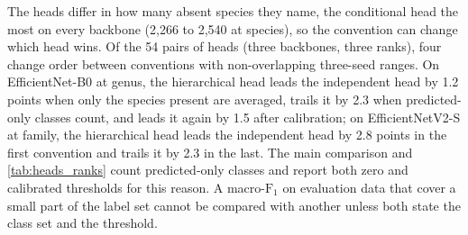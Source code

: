 The heads differ in how many absent species they name, the conditional head the most on every backbone (2,266 to 2,540 at species), so the convention can change which head wins.
Of the 54 pairs of heads (three backbones, three ranks), four change order between conventions with non-overlapping three-seed ranges.
On EfficientNet-B0 at genus, the hierarchical head leads the independent head by 1.2 points when only the species present are averaged, trails it by 2.3 when predicted-only classes count, and leads it again by 1.5 after calibration; on EfficientNetV2-S at family, the hierarchical head leads the independent head by 2.8 points in the first convention and trails it by 2.3 in the last.
The main comparison and \cref{tab:heads_ranks} count predicted-only classes and report both zero and calibrated thresholds for this reason.
A macro-$\text{F}_1$ on evaluation data that cover a small part of the label set cannot be compared with another unless both state the class set and the threshold.
